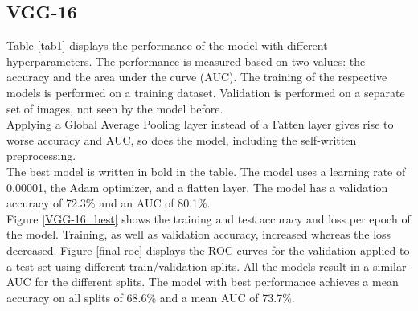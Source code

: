 \documentclass[sn-mathphys,Numbered]{sn-jnl}%
\theoremstyle{thmstyleone}%
\theoremstyle{thmstyletwo}%
\theoremstyle{thmstylethree}%
\begin{document}
\subsection{VGG-16}\label{VGG-16_Results}
Table \ref{tab1} displays the performance of the model with different hyperparameters. The performance is measured based on two values: the accuracy and the area under the curve (AUC).
The training of the respective models is performed on a training dataset. Validation is performed on a separate set of images, not seen by the model before.\\
Applying a Global Average Pooling layer instead of a Fatten layer gives rise to worse accuracy and AUC, so does the model, including the self-written preprocessing.\\
The best model is written in bold in the table. The model uses a learning rate of 0.00001, the Adam optimizer, and a flatten layer. The model has a validation accuracy of 72.3\% and an AUC of 80.1\%.\\
Figure \ref{VGG-16_best} shows the training and test accuracy and loss per epoch of the model. Training, as well as validation accuracy, increased whereas the loss decreased. Figure \ref{final-roc} displays the ROC curves for the validation applied to a test set using different train/validation splits. All the models result in a similar AUC for the different splits. The model with best performance achieves a mean accuracy on all splits of 68.6\% and a mean AUC of 73.7\%.

\newpage
\end{document}
